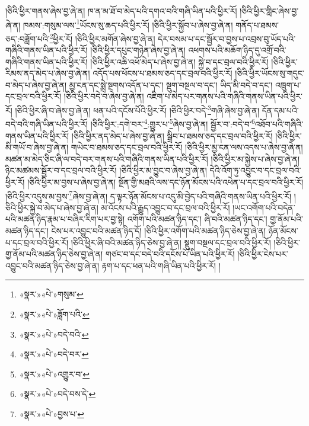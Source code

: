 །ཅིའི་ཕྱིར་གནས་ཞེས་བྱ་ཞེ་ན། ཁ་ན་མ་ཐོ་བ་མེད་པའི་དགའ་བའི་གཞི་ཡིན་པའི་ཕྱིར་རོ། །ཅིའི་ཕྱིར་གླིང་ཞེས་བྱ་ཞེ་ན། ཁམས་:གསུམ་ལས་\footnote{«སྣར་»«པེ་»གསུམ་}ཡོངས་སུ་ཆད་པའི་ཕྱིར་རོ། །ཅིའི་ཕྱིར་སྐྱོབ་པ་ཞེས་བྱ་ཞེ་ན། གནོད་པ་ཐམས་ཅད་:བཟློག་པའི་\footnote{«སྣར་»«པེ་»ཟློག་པའི་}ཕྱིར་རོ། །ཅིའི་ཕྱིར་མགོན་ཞེས་བྱ་ཞེ་ན། དེར་བསམ་པ་དང་སྦྱོར་བ་བྱས་པ་འབྲས་བུ་ཡོད་པའི་གཞིའི་གནས་ཡིན་པའི་ཕྱིར་རོ། །ཅིའི་ཕྱིར་དཔུང་གཉེན་ཞེས་བྱ་ཞེ་ན། འཕགས་པའི་མཆོག་ཉིད་དུ་འགྲོ་བའི་གཞིའི་གནས་ཡིན་པའི་ཕྱིར་རོ། །ཅིའི་ཕྱིར་འཆི་འཕོ་མེད་པ་ཞེས་བྱ་ཞེ་ན། སྐྱེ་བ་དང་བྲལ་བའི་ཕྱིར་རོ། །ཅིའི་ཕྱིར་རིམས་ནད་མེད་པ་ཞེས་བྱ་ཞེ་ན། འདོད་པས་ཕོངས་པ་ཐམས་ཅད་དང་བྲལ་བའི་ཕྱིར་རོ། །ཅིའི་ཕྱིར་ཡོངས་སུ་གདུང་བ་མེད་པ་ཞེས་བྱ་ཞེ་ན། མྱ་ངན་དང་སྨྲེ་སྔགས་འདོན་པ་དང་། སྡུག་བསྔལ་བ་དང་། ཡིད་མི་བདེ་བ་དང་། འཁྲུག་པ་དང་བྲལ་བའི་ཕྱིར་རོ། །ཅིའི་ཕྱིར་བདེ་བ་ཞེས་བྱ་ཞེ་ན། འཇིག་པ་མེད་པར་གནས་པའི་གཞིའི་གནས་ཡིན་པའི་ཕྱིར་རོ། །ཅིའི་ཕྱིར་ཞི་བ་ཞེས་བྱ་ཞེ་ན། ཕན་པའི་དངོས་པོའི་ཕྱིར་རོ། །ཅིའི་ཕྱིར་བདེ་\footnote{«སྣར་»«པེ་»བདེ་བའི་}གཞི་ཞེས་བྱ་ཞེ་ན། དོན་དམ་པའི་བདེ་བའི་གཞི་ཡིན་པའི་ཕྱིར་རོ། །ཅིའི་ཕྱིར་:དགེ་བར་\footnote{«སྣར་»«པེ་»བདེ་བར་}:གྱུར་པ་\footnote{«སྣར་»«པེ་»འགྱུར་བ་}ཞེས་བྱ་ཞེ་ན། སྦྱོར་བ་:བདེ་བ་\footnote{«སྣར་»«པེ་»བདེ་བས་དེ་}འཐོབ་པའི་གཞིའི་གནས་ཡིན་པའི་ཕྱིར་རོ། །ཅིའི་ཕྱིར་ནད་མེད་པ་ཞེས་བྱ་ཞེ་ན། སྒྲིབ་པ་ཐམས་ཅད་དང་བྲལ་བའི་ཕྱིར་རོ། །ཅིའི་ཕྱིར་མི་གཡོ་བ་ཞེས་བྱ་ཞེ་ན། གཡེང་བ་ཐམས་ཅད་དང་བྲལ་བའི་ཕྱིར་རོ། །ཅིའི་ཕྱིར་མྱ་ངན་ལས་འདས་པ་ཞེས་བྱ་ཞེ་ན། མཚན་མ་མེད་ཅིང་ཞི་ལ་བདེ་བར་གནས་པའི་གཞིའི་གནས་ཡིན་པའི་ཕྱིར་རོ། །ཅིའི་ཕྱིར་མ་སྐྱེས་པ་ཞེས་བྱ་ཞེ་ན། ཉིང་མཚམས་སྦྱོར་བ་དང་བྲལ་བའི་ཕྱིར་རོ། །ཅིའི་ཕྱིར་མ་བྱུང་བ་ཞེས་བྱ་ཞེ་ན། དེའི་འོག་ཏུ་འབྱུང་བ་དང་བྲལ་བའི་ཕྱིར་རོ། །ཅིའི་ཕྱིར་མ་བྱས་པ་ཞེས་བྱ་ཞེ་ན། སྔོན་གྱི་མཐའི་ལས་དང་ཉོན་མོངས་པའི་འཕེན་པ་དང་བྲལ་བའི་ཕྱིར་རོ། །ཅིའི་ཕྱིར་འདུས་མ་བྱས་\footnote{«སྣར་»«པེ་»བྱས་པ་}ཞེས་བྱ་ཞེ་ན། ད་ལྟར་ཉོན་མོངས་པ་འདུ་མི་བྱེད་པའི་གཞིའི་གནས་ཡིན་པའི་ཕྱིར་རོ། །ཅིའི་ཕྱིར་སྐྱེ་བ་མེད་པ་ཞེས་བྱ་ཞེ་ན། མ་འོངས་པའི་རྒྱུད་འབྱུང་བ་དང་བྲལ་བའི་ཕྱིར་རོ། །ཡང་འགོག་པའི་བདེན་པའི་མཚན་ཉིད་རྣམ་པ་བཞིར་རིག་པར་བྱ་སྟེ། འགོག་པའི་མཚན་ཉིད་དང་། ཞི་བའི་མཚན་ཉིད་དང་། གྱ་ནོམ་པའི་མཚན་ཉིད་དང་། ངེས་པར་འབྱུང་བའི་མཚན་ཉིད་དོ། །ཅིའི་ཕྱིར་འགོག་པའི་མཚན་ཉིད་ཅེས་བྱ་ཞེ་ན། ཉོན་མོངས་པ་དང་བྲལ་བའི་ཕྱིར་རོ། །ཅིའི་ཕྱིར་ཞི་བའི་མཚན་ཉིད་ཅེས་བྱ་ཞེ་ན། སྡུག་བསྔལ་དང་བྲལ་བའི་ཕྱིར་རོ། །ཅིའི་ཕྱིར་གྱ་ནོམ་པའི་མཚན་ཉིད་ཅེས་བྱ་ཞེ་ན། གཙང་བ་དང་བདེ་བའི་དངོས་པོ་ཡིན་པའི་ཕྱིར་རོ། །ཅིའི་ཕྱིར་ངེས་པར་འབྱུང་བའི་མཚན་ཉིད་ཅེས་བྱ་ཞེ་ན། རྟག་པ་དང་ཕན་པའི་གཞི་ཡིན་པའི་ཕྱིར་རོ། །
